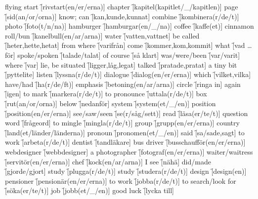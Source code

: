 \begin{questions}
    \begin{multicols}{2}
        \raggedcolumns
        \question flying start \f[rivstart(en/er/erna)]
        \question chapter \f[kapitel(kapitlet/\_/kapitlen)]
        \question page \f[sid(an/or/orna)]
        \question know; can \f[kan,kunde,kunnat]
        \question combine \f[kombinera(r/de/t)]
        \question photo \f[foto(t/n/na)]
        \question hamburger \f[hamburgar(en/\_/na)]
        \question coffee \f[kaffe(et)]
        \question cinnamon roll/bun \f[kanelbull(en/ar/arna)]
        \question water \f[vatten,vattnet]
        \question be called \f[heter,hette,hetat]
        \question from where \f[varifrån]
        \question come \f[kommer,kom,kommit]
        \question what \f[vad \ldots för]
        \question spoke/spoken \f[talade/talat]
        \question of course \f[så klart]
        \question was/were/been \f[var/varit]
        \question where \f[var]
        \question lie, be situated \f[ligger,låg,legat]
        \question talked \f[pratade,pratat]
        \question a tiny bit \f[pyttelite]
        \question listen \f[lyssna(r/de/t)]
        \question dialogue \f[dialog(en/er/erna)]
        \question which \f[vilket,vilka]
        \question have/had \f[ha(r/de/ft)]
        \question emphasis \f[betoning(en/ar/arna)]
        \question circle \f[ringa in]
        \question again \f[igen]
        \question to mark \f[markera(r/de/t)]
        \question to pronounce \f[uttala(r/de/t)]
        \question box \f[rut(an/or/orna)]
        \question below \f[nedanför]
        \question system \f[system(et/\_/en)]
        \question position \f[position(en/er/erna)]
        \question see/saw/seen \f[se(r/såg/sett)]
        \question read \f[läsa(er/te/t)]
        \question question word \f[frågeord]
        \question to mingle \f[mingla(r/de/t)]
        \question group \f[grupp(en/er/erna)]
        \question country \f[land(et/länder/länderna)]
        \question pronoun \f[pronomen(et/\_/en)]
        \question said \f[sa/sade,sagt]
        \question to work \f[arbeta(r/de/t)]
        \question dentist \f[tandläkare]
        \question bus driver \f[busschaufför(en/er/erna)]
        \question webdesigner \f[webbdesigner]
        \question a photographer \f[fotograf(en/er/erna)]
        \question waiter/waitress \f[servitör(en/er/erna)]
        \question chef \f[kock(en/ar/arna)]
        \question I see \f[nähä]
        \question did/made \f[gjorde/gjort]
        \question study \f[plugga(r/de/t)]
        \question study \f[studera(r/de/t)]
        \question design \f[design(en)]
        \question pensioner \f[pensionär(en/er/erna)]
        \question to work \f[jobba(r/de/t)]
        \question to search/look for \f[söka(er/te/t)]
        \question job \f[jobb(et/\_/en)]
        \question good luck \f[lycka till]
    \end{multicols}
\end{questions}

